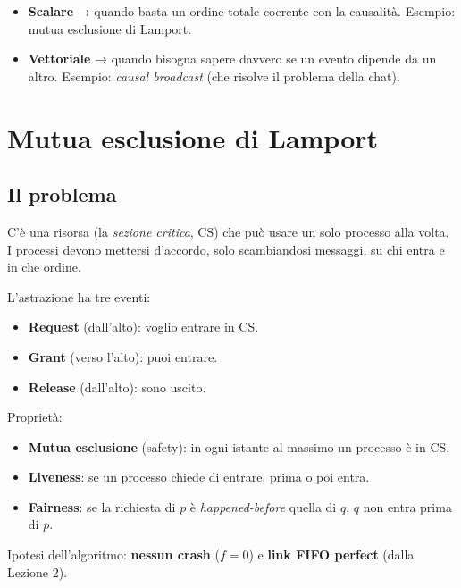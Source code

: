 \begin{itemize}
\tightlist
\item
  \textbf{Scalare} → quando basta un ordine totale coerente con la causalità. Esempio: mutua esclusione di Lamport.
\item
  \textbf{Vettoriale} → quando bisogna sapere davvero se un evento dipende da un altro. Esempio: \emph{causal broadcast} (che risolve il problema della chat).
\end{itemize}

\section{Mutua esclusione di Lamport}

\subsection{Il problema}

\begin{inbreve}

C'è una risorsa (la \emph{sezione critica}, CS) che può usare un solo processo alla volta. I processi devono mettersi d'accordo, solo scambiandosi messaggi, su chi entra e in che ordine.

\end{inbreve}

L'astrazione ha tre eventi:

\begin{itemize}
\tightlist
\item
  \textbf{Request} (dall'alto): voglio entrare in CS.
\item
  \textbf{Grant} (verso l'alto): puoi entrare.
\item
  \textbf{Release} (dall'alto): sono uscito.
\end{itemize}

Proprietà:

\begin{itemize}
\tightlist
\item
  \textbf{Mutua esclusione} (safety): in ogni istante al massimo un processo è in CS.
\item
  \textbf{Liveness}: se un processo chiede di entrare, prima o poi entra.
\item
  \textbf{Fairness}: se la richiesta di \(p\) è \emph{happened-before} quella di \(q\), \(q\) non entra prima di \(p\).
\end{itemize}

Ipotesi dell'algoritmo: \textbf{nessun crash} (\(f = 0\)) e \textbf{link FIFO perfect} (dalla Lezione 2).

